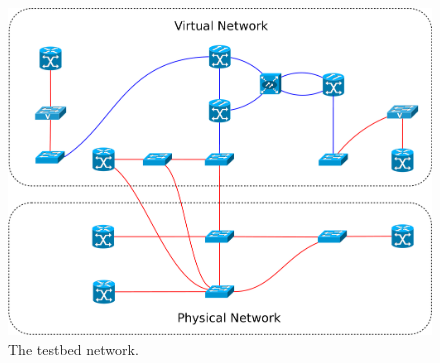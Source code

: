 \documentclass[10pt,a4paper]{report}
\begin{document}
\begin{figure}[!htbp]
  \begin{center}
    \includegraphics[width=1\textwidth]{img/testbed_model}
    \caption[Testbed representation]{The testbed network.}
    \label{fig:testbed_model}
  \end{center}
\end{figure}
\end{document}
